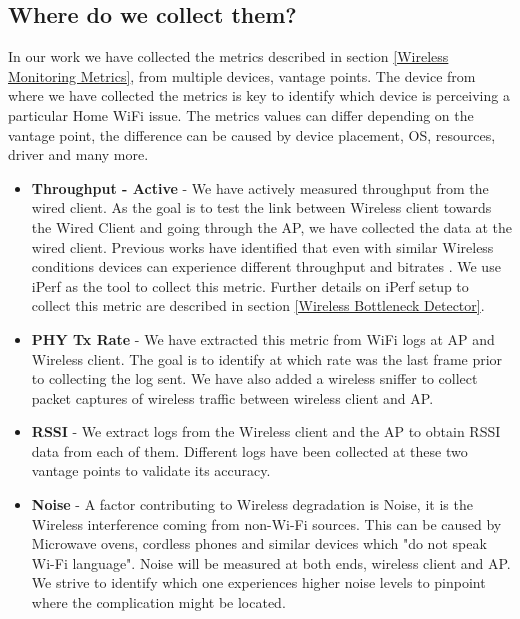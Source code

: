 \subsection{Where do we collect them?}

In our work we have collected the metrics described in section \ref{Wireless Monitoring Metrics}, from multiple devices, vantage points. The device from where we have collected the metrics is key to identify which device is perceiving a particular Home WiFi issue. The metrics values can differ depending on the vantage point, the difference can be caused by device placement, OS, resources, driver and many more.

\begin{itemize}
	\item \textbf{Throughput - Active} - We have actively measured throughput from the wired client. As the goal is to test the link between Wireless client towards the Wired Client and going through the AP, we have collected the data at the wired client. Previous works have identified that even with similar Wireless conditions devices can experience different throughput and bitrates \cite{measuring_user_traffic}. We use iPerf as the tool to collect this metric. Further details on iPerf setup to collect this metric are described in section \ref{Wireless Bottleneck Detector}.
	
	\item \textbf{PHY Tx Rate} - We have extracted this metric from WiFi logs at AP and Wireless client. The goal is to identify at which rate was the last frame prior to collecting the log sent. We have also added a wireless sniffer to collect packet captures of wireless traffic between wireless client and AP.
	
	\item \textbf{RSSI} - We extract logs from the Wireless client and the AP to obtain RSSI data from each of them. Different logs have been collected at these two vantage points to validate its accuracy.
	
	\item \textbf{Noise} - A factor contributing to Wireless degradation is Noise, it is the Wireless interference coming from non-Wi-Fi sources. This can be caused by Microwave ovens, cordless phones and similar devices which "do not speak Wi-Fi language". Noise will be measured at both ends, wireless client and AP. We strive to identify which one experiences higher noise levels to pinpoint where the complication might be located.
	

\end{itemize}
